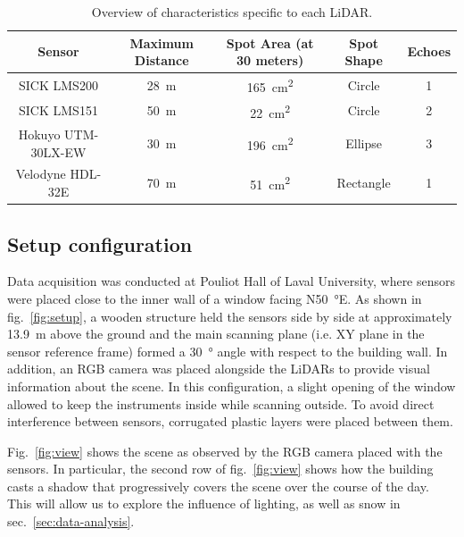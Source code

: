 \begin{table}[htbp]
    \centering
    \begin{tabular}{|c|c|c|c|c|}
    \hline
        \textbf{Sensor}     & \textbf{Maximum Distance}  & \textbf{Spot Area (at 30 meters)}  & \textbf{Spot Shape} & \textbf{Echoes} \\ 
        \hline
        SICK LMS200         & \SI{28}{\meter}            & \SI{165}{\centi\meter\squared}     & Circle              & 1               \\ 
        \hline
        SICK LMS151         & \SI{50}{\meter}            & \SI{22}{\centi\meter\squared}      & Circle              & 2               \\ 
        \hline
        Hokuyo UTM-30LX-EW  & \SI{30}{\meter}            & \SI{196}{\centi\meter\squared}     & Ellipse             & 3               \\ 
        \hline
        Velodyne HDL-32E    & \SI{70}{\meter}            & \SI{51}{\centi\meter\squared}      & Rectangle           & 1               \\ 
        \hline
    \end{tabular}
    \caption{Overview of characteristics specific to each LiDAR.}
    \label{tab:lidars}
\end{table}

\subsection{Setup configuration}

Data acquisition was conducted at Pouliot Hall of Laval University, where sensors were placed close to the inner wall of a window facing N\SI{50}{\degree}E. As shown in fig.~\ref{fig:setup}, a wooden structure held the sensors side by side at approximately \SI{13.9}{\meter} above the ground and the main scanning plane (i.e. XY plane in the sensor reference frame) formed a \SI{30}{\degree} angle with respect to the building wall. In addition, an RGB camera was placed alongside the LiDARs to provide visual information about the scene. In this configuration, a slight opening of the window allowed to keep the instruments inside while scanning outside. To avoid direct interference between sensors, corrugated plastic layers were placed between them. 

Fig.~\ref{fig:view} shows the scene as observed by the RGB camera placed with the sensors. In particular, the second row of fig.~\ref{fig:view} shows how the building casts a shadow that progressively covers the scene over the course of the day. This will allow us to explore the influence of lighting, as well as snow in sec.~\ref{sec:data-analysis}. 

